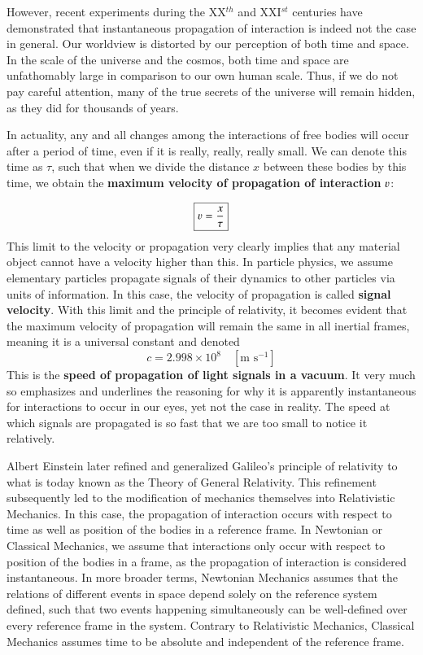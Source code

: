 \documentclass{article}
\begin{document}
			However, recent experiments during the XX$^{th}$ and XXI$^{st}$ centuries have demonstrated that instantaneous propagation of interaction is indeed not the case in general. Our worldview is distorted by our perception of both time and space. In the scale of the universe and the cosmos, both time and space are unfathomably large in comparison to our own human scale. Thus, if we do not pay careful attention, many of the true secrets of the universe will remain hidden, as they did for thousands of years. 
			
			In actuality, any and all changes among the interactions of free bodies will occur after a period of time, even if it is really, really, really small. We can denote this time as $\tau$, such that when we divide the distance $x$ between these bodies by this time, we obtain the \textbf{maximum velocity of propagation of interaction} $\varv$:
			
			\begin{equation}
				\label{eq:VelocityInteraction}
				\boxed{\varv = \frac{x}{\tau}}
			\end{equation}
			This limit to the velocity or propagation very clearly implies that any material object cannot have a velocity higher than this. In particle physics, we assume elementary particles propagate signals of their dynamics to other particles via units of information. In this case, the velocity of propagation is called \textbf{signal velocity}. With this limit and the principle of relativity, it becomes evident that the maximum velocity of propagation will remain the same in all inertial frames, meaning it is a universal constant and denoted 
			\begin{equation}
				\label{var:LightSpeed}
				\boxed {c = 2.998 \times 10^8 \quad [\text{m } \text{s}^{-1}]}
			\end{equation}
			This is the \textbf{speed of propagation of light signals in a vacuum}. It very much so emphasizes and underlines the reasoning for why it is apparently instantaneous for interactions to occur in our eyes, yet not the case in reality. The speed at which signals are propagated is so fast that we are too small to notice it relatively. 
			
			Albert Einstein later refined and generalized Galileo's principle of relativity to what is today known as the Theory of General Relativity. This refinement subsequently led to the modification of mechanics themselves into Relativistic Mechanics. In this case, the propagation of interaction occurs with respect to time as well as position of the bodies in a reference frame. In Newtonian or Classical Mechanics, we assume that interactions only occur with respect to position of the bodies in a frame, as the propagation of interaction is considered instantaneous. In more broader terms, Newtonian Mechanics assumes that the relations of different events in space depend solely on the reference system defined, such that two events happening simultaneously can be well-defined over every reference frame in the system. Contrary to Relativistic Mechanics, Classical Mechanics assumes time to be absolute and independent of the reference frame.
			
\end{document}
